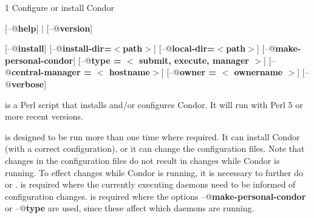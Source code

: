\begin{ManPage}{\label{man-condor-configure}}{1}
{Configure or install Condor}

\Synopsis {}
[\verb@--@\textbf{help}] $|$ [\verb@--@\textbf{version}]

[\verb@--@\textbf{install}]
[\verb@--@\textbf{install-dir=$<$path$>$}]
[\verb@--@\textbf{local-dir=$<$path$>$}]
[\verb@--@\textbf{make-personal-condor}]
[\verb@--@\textbf{type = $<$ submit, execute, manager $>$}]
[\verb@--@\textbf{central-manager = $<$ hostname$>$}]
[\verb@--@\textbf{owner = $<$ ownername $>$}]
[\verb@--@\textbf{verbose}]






\Description 

 is a Perl script that installs and/or configures
Condor.
It will run with Perl 5 or more recent versions.

 is designed to be run more than one time
where required.
It can install Condor (with a correct configuration),
or it can change the configuration files.
Note that changes in the configuration files do not result
in changes while Condor is running.
To effect changes while Condor is running,
it is necessary to further do  or .
  is required where the currently executing
daemons need to be informed of configuration changes.
 is required where the options
\verb@--@\textbf{make-personal-condor} or
\verb@--@\textbf{type}
are used, since these affect which daemons are running.


\end{ManPage}
